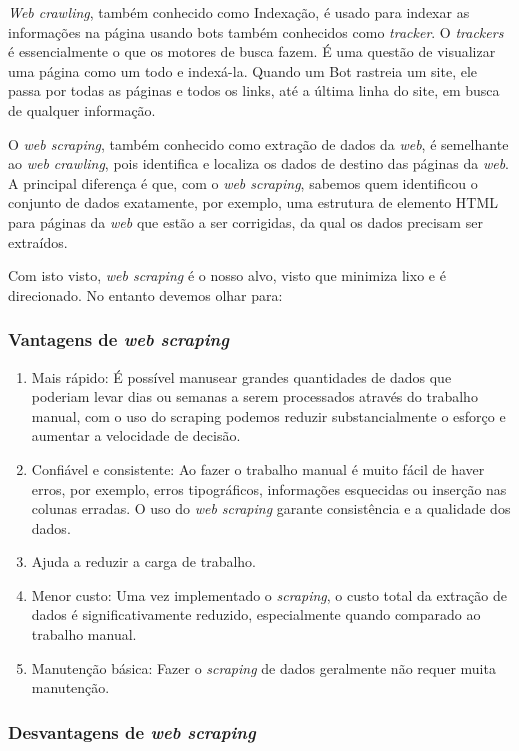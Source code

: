 \documentclass[a4paper,10pt]{article}
\begin{document}
\textit{Web crawling}, também conhecido como Indexação, é usado para indexar as informações na página usando bots também conhecidos como \textit{tracker}.
O \textit{trackers} é essencialmente o que os motores de busca fazem.
É uma questão de visualizar uma página como um todo e indexá-la.
Quando um Bot rastreia um site, ele passa por todas as páginas e todos os links, até a última linha do site, em busca de qualquer informação.

O \textit{web scraping}, também conhecido como extração de dados da \textit{web}, é semelhante ao \textit{web crawling}, pois identifica e localiza os dados de destino das páginas da \textit{web}.
A principal diferença é que, com o \textit{web scraping}, sabemos quem identificou o conjunto de dados exatamente, por exemplo, uma estrutura de elemento HTML para páginas da \textit{web} que estão a ser corrigidas, da qual os dados precisam ser extraídos.

Com isto visto, \textit{web scraping} é o nosso alvo, visto que minimiza lixo e é direcionado.
No entanto devemos olhar para:

\subsubsection{Vantagens de \textit{web scraping}}

\begin{enumerate}
    \item Mais rápido: É possível manusear grandes quantidades de dados que poderiam levar dias ou semanas a serem processados através do trabalho manual, com o uso do scraping podemos reduzir substancialmente o esforço e aumentar a velocidade de decisão.
    \item Confiável e consistente: Ao fazer o trabalho manual é muito fácil de haver erros, por exemplo, erros tipográficos, informações esquecidas ou inserção nas colunas erradas. O uso do \textit{web scraping} garante consistência e a qualidade dos dados.
    \item Ajuda a reduzir a carga de trabalho.
    \item Menor custo: Uma vez implementado o \textit{scraping}, o custo total da extração de dados é significativamente reduzido, especialmente quando comparado ao trabalho manual.
    \item Manutenção básica: Fazer o \textit{scraping} de dados geralmente não requer muita manutenção.
\end{enumerate}

\subsubsection{Desvantagens de \textit{web scraping}}
\end{document}
